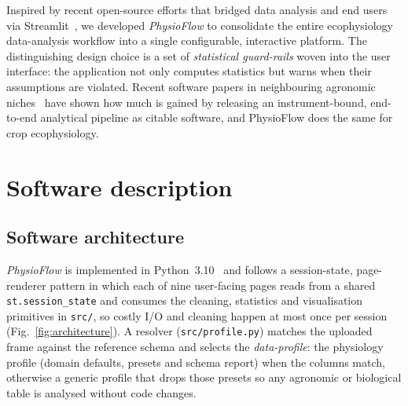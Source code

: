 \documentclass[11pt, letterpaper]{article}
\begin{document}
Inspired by recent open-source efforts that bridged data analysis and end users via Streamlit~\cite{Streamlit,daSilva2025Parkinson,DaSilva2026Goias}, we developed \emph{PhysioFlow} to consolidate the entire ecophysiology data-analysis workflow into a single configurable, interactive platform. The distinguishing design choice is a set of \emph{statistical guard-rails} woven into the user interface: the application not only computes statistics but warns when their assumptions are violated. Recent software papers in neighbouring agronomic niches~\cite{Magala2026apsimNGpy,Crecco2026prismatools} have shown how much is gained by releasing an instrument-bound, end-to-end analytical pipeline as citable software, and PhysioFlow does the same for crop ecophysiology.

\section{Software description}\label{sec:software}

\subsection{Software architecture}\label{sec:arch}

\emph{PhysioFlow} is implemented in Python~3.10~\cite{Streamlit,McKinney2010,Harris2020} and follows a session-state, page-renderer pattern in which each of nine user-facing pages reads from a shared \texttt{st.session\_state} and consumes the cleaning, statistics and visualisation primitives in \texttt{src/}, so costly I/O and cleaning happen at most once per session (Fig.~\ref{fig:architecture}). A resolver (\texttt{src/profile.py}) matches the uploaded frame against the reference schema and selects the \emph{data-profile}: the physiology profile (domain defaults, presets and schema report) when the columns match, otherwise a generic profile that drops those presets so any agronomic or biological table is analysed without code changes.
\end{document}
